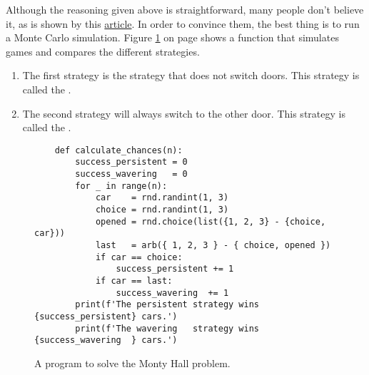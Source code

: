 Although the reasoning given above is straightforward, many people don't believe it, as is shown
by this \href{https://priceonomics.com/the-time-everyone-corrected-the-worlds-smartest/}{article}.  In order to
convince them, the best thing is to run a Monte Carlo simulation.  Figure \ref{fig:Monty-Hall-Problem.ipynb}
on page 
\pageref{fig:Monty-Hall-Problem.ipynb} shows a function that simulates  games and compares the
different strategies.  
\begin{enumerate}
\item The first strategy is the strategy that does not switch doors.
      This strategy is called the .
\item The second strategy will always switch to the other door.
      This strategy is called the .
\end{enumerate}

\begin{figure}[!ht]
\centering
\begin{verbatim}
    def calculate_chances(n):
        success_persistent = 0
        success_wavering   = 0
        for _ in range(n):
            car    = rnd.randint(1, 3)
            choice = rnd.randint(1, 3) 
            opened = rnd.choice(list({1, 2, 3} - {choice, car}))
            last   = arb({ 1, 2, 3 } - { choice, opened })
            if car == choice:
                success_persistent += 1
            if car == last:
                success_wavering  += 1
        print(f'The persistent strategy wins {success_persistent} cars.')
        print(f'The wavering   strategy wins {success_wavering  } cars.')
\end{verbatim}
\vspace*{-0.3cm}
\caption{A program to solve the Monty Hall problem.}
\label{fig:Monty-Hall-Problem.ipynb}
\end{figure}
\FloatBarrier


